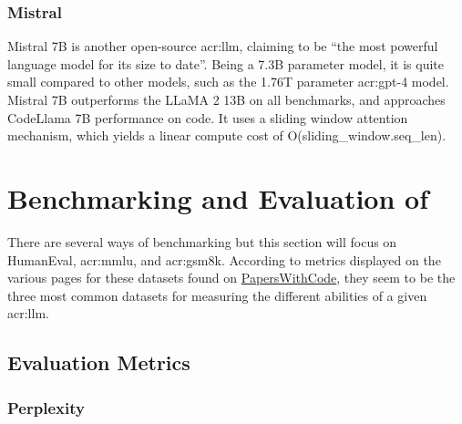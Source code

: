 \subsubsection{Mistral}

Mistral 7B \citep{aiMistral7B2023} is another open-source \acrshort{acr:llm}, claiming to be \enquote{the most powerful language model for its size to date}. Being a 7.3B parameter model, it is quite small compared to other models, such as the 1.76T parameter \acrshort{acr:gpt}-4 model. Mistral 7B outperforms the LLaMA 2 13B on all benchmarks, and approaches CodeLlama 7B performance on code. It uses a sliding window attention mechanism, which yields a linear compute cost of O(sliding\_window.seq\_len).


\section[Benchmarking and Evaluation of LLMs]{Benchmarking and Evaluation of }\label{sec:benchmarking-and-evaluation}


There are several ways of benchmarking  but this section will focus on HumanEval, \gls{acr:mmlu}, and \gls{acr:gsm8k}. According to metrics displayed on the various pages for these datasets found on \href{https://paperswithcode.com}{PapersWithCode}, they seem to be the three most common datasets for measuring the different abilities of a given \acrshort{acr:llm}.

\subsection{Evaluation Metrics}\label{subsec:evaluation-metrics}

\subsubsection{Perplexity}

